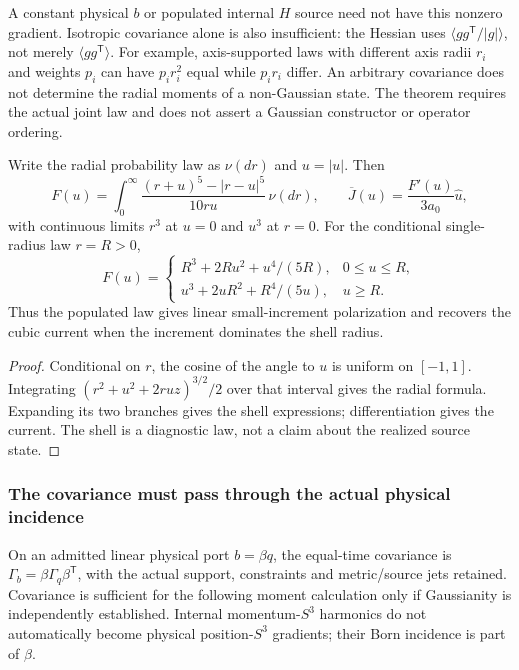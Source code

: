 \documentclass[12pt,a4paper]{article}
\begin{document}
A constant physical $b$ or populated internal $H$ source need not have
this nonzero gradient. Isotropic covariance alone is also insufficient:
the Hessian uses $\langle gg^{\mathsf T}/|g|\rangle$, not merely
$\langle gg^{\mathsf T}\rangle$. For example, axis-supported laws with
different axis radii $r_i$ and weights $p_i$ can have $p_ir_i^2$ equal
while $p_ir_i$ differ. An arbitrary covariance does not determine the
radial moments of a non-Gaussian state. The theorem requires the actual
joint law and does not assert a Gaussian constructor or operator ordering.

\begin{proposition}
\label{p8:prop:v2209-state-rar-radial-law}
Write the radial probability law as $\nu(dr)$ and $u=|u|$. Then
\begin{equation}
\label{p8:eq:v2209-state-rar-radial-law}
 F(u)=\int_0^\infty\frac{(r+u)^5-|r-u|^5}{10ru}\,\nu(dr),
 \qquad \overline J(u)=\frac{F'(u)}{3a_0}\widehat u,
\end{equation}
with continuous limits $r^3$ at $u=0$ and $u^3$ at $r=0$.
For the conditional single-radius law $r=R>0$,
\begin{equation}
\label{p8:eq:v2209-state-rar-shell}
 F(u)=\begin{cases}
 R^3+2Ru^2+u^4/(5R),&0\le u\le R,\\
 u^3+2uR^2+R^4/(5u),&u\ge R.
 \end{cases}
\end{equation}
Thus the populated law gives linear small-increment polarization and
recovers the cubic current when the increment dominates the shell radius.
\end{proposition}
\begin{proof}
Conditional on $r$, the cosine of the angle to $u$ is uniform on $[-1,1]$.
Integrating $(r^2+u^2+2ruz)^{3/2}/2$ over that interval gives the radial
formula. Expanding its two branches gives the shell expressions;
differentiation gives the current. The shell is a diagnostic law, not
a claim about the realized source state.
\end{proof}

\subsubsection{The covariance must pass through the actual physical incidence}
On an admitted linear physical port $b=\beta q$, the equal-time covariance
is $\Gamma_b=\beta\Gamma_q\beta^{\mathsf T}$, with the actual support,
constraints and metric/source jets retained. Covariance is sufficient for
the following moment calculation only if Gaussianity is independently
established. Internal momentum-$S^3$ harmonics do not automatically become
physical position-$S^3$ gradients; their Born incidence is part of $\beta$.
\end{document}
